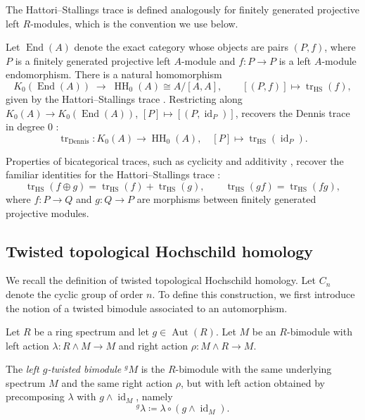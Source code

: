 \documentclass[11pt,oneside]{amsart}
\DeclareMathOperator{\HH}{HH}
\DeclareMathOperator{\End}{End}
\DeclareMathOperator{\id}{id}
\DeclareMathOperator{\Aut}{Aut}
\numberwithin{equation}{section}
\numberwithin{figure}{section}
\theoremstyle{plain}
\theoremstyle{definition}
\theoremstyle{remark}
\begin{document}
The Hattori--Stallings trace is defined analogously for finitely generated projective left $R$-modules, which is the convention we use below.
\begin{remark}Let $\End(A)$ denote the exact category whose objects are pairs $(P, f)$, where $P$ is a finitely generated projective left $A$-module and $f \colon P \to P$ is a left $A$-module endomorphism. 
There is a natural homomorphism
\[
K_0(\End(A)) \;\longrightarrow\; \HH_0(A)\cong A/[A,A], \qquad [(P,f)] \mapsto \operatorname{tr}_{\mathrm{HS}}(f),
\]
given by the Hattori--Stallings trace \cite{HA}. 
Restricting along $K_0(A)\to K_0(\End(A))$, $[P]\mapsto[(P,\id_P)]$, recovers the Dennis trace in degree 0 \cite[V.11.1]{weibel:homological}:
\[
\operatorname{tr}_{\mathrm{Dennis}}: K_0(A)\to \HH_0(A), \quad [P]\mapsto \operatorname{tr}_{\mathrm{HS}}(\id_P).
\]

Properties of bicategorical traces, such as cyclicity \cite[Prop.~7.2 and Cor.~7.3]{PONSH} and additivity \cite[Thm.~1.4]{PSL}, recover the familiar identities for the Hattori--Stallings trace \cite{HA}:
\[
\operatorname{tr}_{\mathrm{HS}}(f\oplus g)
=
\operatorname{tr}_{\mathrm{HS}}(f)+\operatorname{tr}_{\mathrm{HS}}(g),
\qquad
\operatorname{tr}_{\mathrm{HS}}(gf)
=
\operatorname{tr}_{\mathrm{HS}}(fg),
\]
where $f\colon P\to Q$ and $g\colon Q\to P$ are morphisms between finitely generated projective modules.
\end{remark}

 





\subsection{Twisted topological Hochschild homology}
We recall the definition of twisted topological Hochschild homology. Let $C_n$ denote the cyclic group of order $n$. To define this construction, we first introduce the notion of a twisted bimodule associated to an automorphism.

\begin{definition}\label{def:twisted-bimodule-spectra}
Let $R$ be a ring spectrum and let $g\in \Aut(R)$. Let $M$ be an $R$-bimodule
with left action $\lambda \colon R \wedge M \to M$ and right action
$\rho \colon M \wedge R \to M$.

The \emph{left $g$-twisted bimodule} ${}^gM$ is the $R$-bimodule with the same
underlying spectrum $M$ and the same right action $\rho$, but with left action
obtained by precomposing $\lambda$ with $g \wedge \id_M$, namely
\[
{}^g\lambda \coloneqq \lambda \circ (g \wedge \id_M).
\]
\end{definition}
\end{document}
